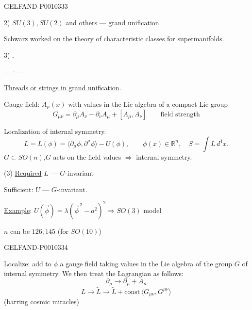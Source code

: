 \begin{GelfandAdjacentEvidence}{GELFAND-P001033}{3}


2) $SU(3),SU(2)$ and others --- grand unification.

Schwarz worked on the theory of characteristic classes for supermanifolds.

3)   .

\begin{center}--- $\cdot$ ---\end{center}

\underline{Threads or strings in grand unification}.

Gauge field: $A_\mu(x)$ with values in the Lie algebra of a compact Lie group
\begin{equation*}
G_{\mu\nu}=\partial_\mu A_\nu-\partial_\nu A_\mu+[A_\mu,A_\nu]
\qquad \text{field strength}
\tag{1}
\end{equation*}

Localization of internal symmetry.
\begin{equation*}
L=L(\phi)=\langle\partial_\mu\phi,\partial^\mu\phi\rangle-U(\phi),
\qquad \phi(x)\in\mathbb R^n,\quad S=\int L\,d^4x.
\tag{2}
\end{equation*}
$G\subset SO(n)$,\qquad $G$ acts on the field values $\Rightarrow$ internal symmetry.

(3) \underline{Required} $L$ --- $G$-invariant

Sufficient: $U$ --- $G$-invariant.

\underline{Example}: $U(\vec\phi)=\lambda(\vec\phi^{\,2}-a^2)^2\Rightarrow SO(3)$ model

$n$ can be $126,145$ (for $SO(10)$)
\end{GelfandAdjacentEvidence}
\begin{GelfandAdjacentEvidence}{GELFAND-P001033}{4}


Localize: add to $\phi$ a gauge field taking values in the Lie algebra of the group $G$ of internal symmetry. We then treat the Lagrangian as follows:
\[
\partial_\mu\to\partial_\mu+A_\mu
\]
\begin{equation*}
L\to\widetilde L\to\widetilde L+\mathrm{const}\,\langle G_{\mu\nu},G^{\mu\nu}\rangle
\tag{4}
\end{equation*}
(barring cosmic miracles)
\end{GelfandAdjacentEvidence}
